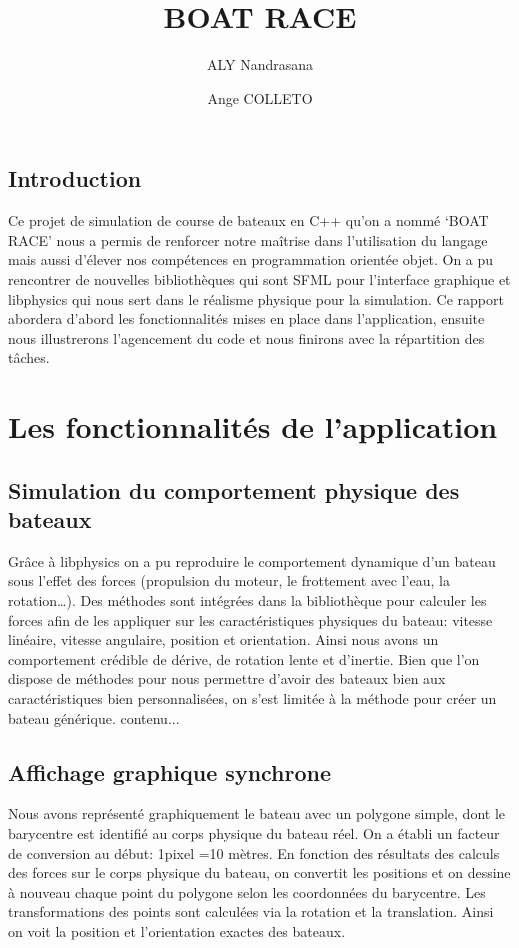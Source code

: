 \documentclass[a4paper,margin=1cm,11pt]{report}
\title{\Huge BOAT RACE}
\author{ALY Nandrasana \and Ange COLLETO}
\begin{document}
\maketitle

\tableofcontents
\newpage
\section*{Introduction}
Ce projet de simulation de course de bateaux en C++ qu’on a nommé ‘BOAT RACE’ nous a permis de renforcer notre maîtrise dans l’utilisation du langage mais aussi d'élever nos compétences en programmation orientée objet. On a pu rencontrer de nouvelles bibliothèques qui sont SFML pour l’interface graphique et libphysics qui nous sert dans le réalisme physique pour la simulation. 
Ce rapport abordera d’abord les fonctionnalités mises en place dans l’application, ensuite nous illustrerons l’agencement du code et nous finirons avec la répartition des tâches.

\chapter{Les fonctionnalités de l'application}
\section{Simulation du comportement physique des bateaux}

Grâce à libphysics on a pu reproduire le comportement dynamique d’un bateau sous l’effet des forces (propulsion du moteur, le frottement avec l’eau, la rotation…).
Des méthodes sont intégrées dans la bibliothèque pour calculer les forces afin de les appliquer sur les caractéristiques physiques du bateau: vitesse linéaire, vitesse angulaire, position et orientation. 
Ainsi nous avons un comportement crédible de dérive, de rotation lente et d’inertie.
Bien que l’on dispose de méthodes pour nous permettre d’avoir des bateaux bien aux caractéristiques bien personnalisées, on s’est limitée à la méthode pour créer un bateau générique. contenu...

\section{Affichage graphique synchrone}
Nous avons représenté graphiquement le bateau avec un polygone simple, dont le barycentre est identifié au corps physique du bateau réel.
On a établi un facteur de conversion au début: 1pixel =10 mètres.
En fonction des résultats des calculs des forces sur le corps physique du bateau, on convertit les positions et on dessine à nouveau chaque point du polygone selon les coordonnées du barycentre. Les transformations des points sont calculées via la rotation et la translation.
Ainsi on voit la position et l’orientation exactes des bateaux.
\end{document}
